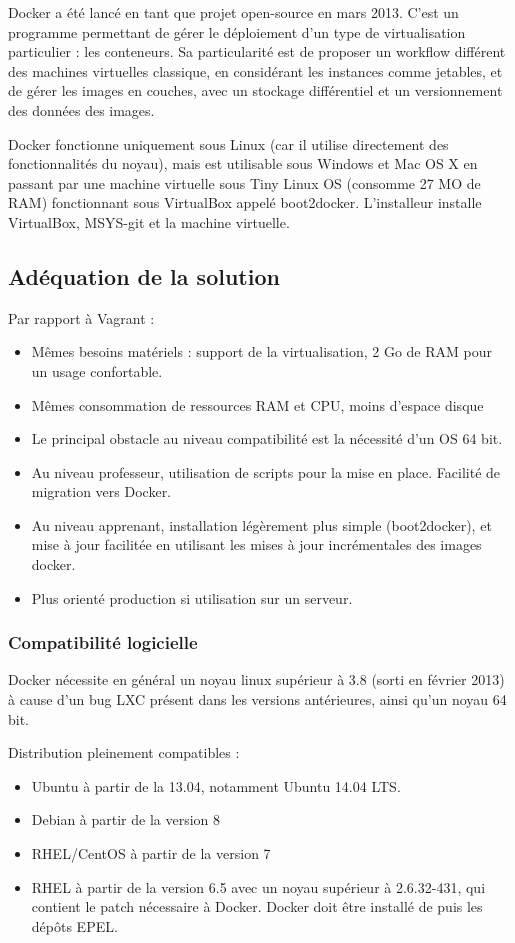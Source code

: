 \documentclass[a4paper,11pt]{report}
\begin{document}
Docker\cite{website:whatis-docker} a été lancé en tant que projet open-source en mars 2013.
C'est un programme permettant de gérer le déploiement d'un type de virtualisation particulier : les conteneurs. Sa particularité est de proposer un workflow différent des machines virtuelles classique, en considérant les instances comme jetables, et de gérer les images en couches, avec un stockage différentiel et un versionnement des données des images.
  
Docker fonctionne uniquement sous Linux (car il utilise directement des fonctionnalités du noyau), mais est utilisable sous Windows et Mac OS X en passant par une machine virtuelle sous Tiny Linux OS (consomme 27 MO de RAM) fonctionnant sous VirtualBox appelé boot2docker. L'installeur installe VirtualBox, MSYS-git et la machine virtuelle.
  
\subsection{Adéquation de la solution}

Par rapport à Vagrant :
\begin{itemize}
  \item Mêmes besoins matériels : support de la virtualisation, 2 Go de RAM pour un usage confortable.
  \item Mêmes consommation de ressources RAM et CPU, moins d'espace disque
  \item Le principal obstacle au niveau compatibilité est la nécessité d'un OS 64 bit.
  \item Au niveau professeur, utilisation de scripts pour la mise en place. Facilité de migration vers Docker.
  \item Au niveau apprenant, installation légèrement plus simple (boot2docker), et mise à jour facilitée en utilisant les mises à jour incrémentales des images docker.
  \item Plus orienté production si utilisation sur un serveur.
\end{itemize}

\subsubsection{Compatibilité logicielle}

Docker nécessite en général un noyau linux supérieur à 3.8 (sorti en février 2013) à cause d'un bug LXC présent dans les versions antérieures, ainsi qu'un noyau 64 bit.

Distribution pleinement compatibles :
\begin{itemize}
  \item Ubuntu à partir de la 13.04, notamment Ubuntu 14.04 LTS.
  \item Debian à partir de la version 8
  \item RHEL/CentOS à partir de la version 7
  \item RHEL à partir de la version 6.5 avec un noyau supérieur à 2.6.32-431, qui contient le patch nécessaire à Docker. Docker doit être installé de puis les dépôts EPEL.
\end{itemize}
\end{document}
